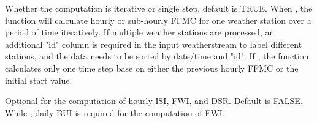 \documentclass[a4paper]{book}
\begin{document}
\begin{Arguments}
\begin{ldescription}
\item[\code{batch}] Whether the computation is iterative or single step, default is
TRUE. When , the function will calculate hourly or
sub-hourly FFMC for one weather station over a period of time iteratively.
If multiple weather stations are processed, an additional "id" column is
required in the input weatherstream to label different stations, and the
data needs to be sorted by date/time and "id".  If , the
function calculates only one time step base on either the previous hourly
FFMC or the initial start value.

\item[\code{hourlyFWI}] Optional for the computation of hourly ISI, FWI, and DSR.
Default is FALSE. While , daily BUI is required for the
computation of FWI.
\end{ldescription}
\end{Arguments}
%
\end{document}
